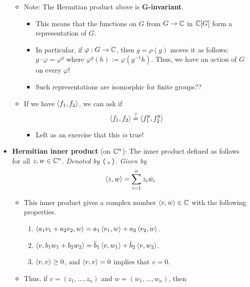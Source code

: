 \documentclass[../notes.tex]{subfiles}
\begin{document}
\begin{itemize}
\begin{itemize}
\begin{itemize}
        \end{itemize}
        \item Note: The Hermitian product above is \textbf{$\bm{G}$-invariant}.
        \begin{itemize}
            \item This means that the functions on $G$ from $G\to\mathbb{C}$ in $\mathbb{C}[G]$ form a representation of $G$.
            \item In particular, if $\varphi:G\to\mathbb{C}$, then $g=\rho(g)$ moves it as follows: $g\cdot\varphi=\varphi^g$ where $\varphi^g(h):=\varphi(g^{-1}h)$. Thus, we have an action of $G$ on every $\varphi$!
            \item Such representations are isomorphic for finite groups??
        \end{itemize}
        \item If we have $\left\langle{f_1,f_2}\right\rangle$, we can ask if
        \begin{equation*}
            \left\langle{f_1,f_2}\right\rangle \stackrel{?}{=} \left\langle{f_1^g,f_2^g}\right\rangle
        \end{equation*}
        \begin{itemize}
            \item Left as an exercise that this \emph{is} true!
        \end{itemize}
    \end{itemize}
    \item \textbf{Hermitian inner product} (on $\mathbb{C}^n$): The inner product defined as follows for all $z,w\in\mathbb{C}^n$. \emph{Denoted by} $\bm{\left\langle{\ ,\ }\right\rangle}$. \emph{Given by}
    \begin{equation*}
        \left\langle{z,w}\right\rangle = \sum_{i=1}^nz_i\bar{w}_i
    \end{equation*}
    \begin{itemize}
        \item This inner product gives a complex number $\left\langle{v,w}\right\rangle\in\mathbb{C}$ with the following properties.
        \begin{enumerate}
            \item $\left\langle{a_1v_1+a_2v_2,w}\right\rangle=a_1\left\langle{v_1,w}\right\rangle+a_2\left\langle{v_2,w}\right\rangle$.
            \item $\left\langle{v,b_1w_1+b_2w_2}\right\rangle=\bar{b}_1\left\langle{v,w_1}\right\rangle+\bar{b}_2\left\langle{v,w_2}\right\rangle$.
            \item $\left\langle{v,v}\right\rangle\geq 0$, and $\left\langle{v,v}\right\rangle=0$ implies that $v=0$.
        \end{enumerate}
        \item Thus, if $v=(z_1,\dots,z_n)$ and $w=(w_1,\dots,w_n)$, then
        \begin{align*}

\end{align*}
\end{itemize}
\end{itemize}
\end{document}
